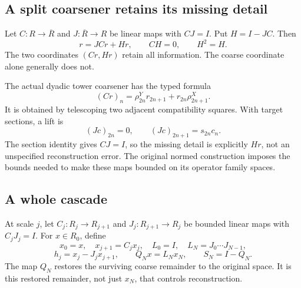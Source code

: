 

\label{sec:cascade}
\subsection{A split coarsener retains its missing detail}
Let \(C:R\to\overline R\) and \(J:\overline R\to R\) be linear maps with \(CJ=I\). Put \(H=I-JC\). Then
\[
 r=JCr+Hr,\qquad CH=0,\qquad H^2=H.
\]
The two coordinates \((Cr,Hr)\) retain all information. The coarse coordinate alone generally does not.

The actual dyadic tower coarsener has the typed formula
\begin{equation}\label{eq:dyadic}
 (Cr)_n=\rho^Y_{2n}r_{2n+1}+r_{2n}\rho^X_{2n+1}.
\end{equation}
It is obtained by telescoping two adjacent compatibility squares. With target sections, a lift is
\[
 (Jc)_{2n}=0,\qquad (Jc)_{2n+1}=s_{2n}c_n.
\]
The section identity gives \(CJ=I\), so the missing detail is explicitly \(Hr\), not an unspecified reconstruction error. The original normed construction imposes the bounds needed to make these maps bounded on its operator family spaces.

\subsection{A whole cascade}
At scale \(j\), let \(C_j:R_j\to R_{j+1}\) and \(J_j:R_{j+1}\to R_j\) be bounded linear maps with \(C_jJ_j=I\). For \(x\in R_0\), define
\[
 x_0=x,\quad x_{j+1}=C_jx_j,\quad
 L_0=I,\quad L_N=J_0\cdots J_{N-1},
\]
\[
 h_j=x_j-J_jx_{j+1},\qquad Q_Nx=L_Nx_N,
 \qquad S_N=I-Q_N.
\]
The map \(Q_N\) restores the surviving coarse remainder to the original space. It is this restored remainder, not just \(x_N\), that controls reconstruction.

